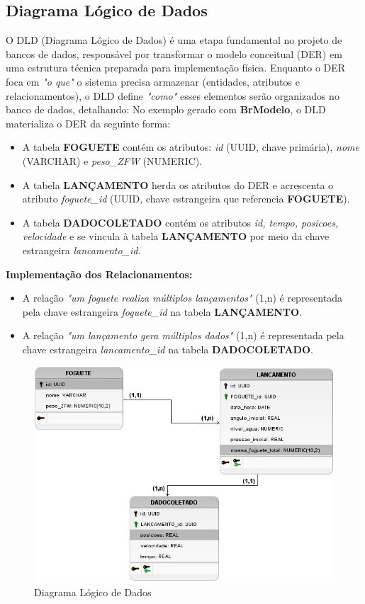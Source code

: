 \subsection{Diagrama Lógico de Dados}

O DLD (Diagrama Lógico de Dados) é uma etapa fundamental no projeto de bancos de dados, responsável por transformar o modelo conceitual (DER) em uma estrutura técnica preparada para implementação física. Enquanto o DER foca em \textit{"o que"} o sistema precisa armazenar (entidades, atributos e relacionamentos), o DLD define \textit{"como"} esses elementos serão organizados no banco de dados, detalhando: No exemplo gerado com \textbf{BrModelo}, o DLD materializa o DER da seguinte forma:

\begin{itemize}
  \item A tabela \textbf{FOGUETE} contém os atributos: \textit{id} (UUID, chave primária), \textit{nome} (VARCHAR) e \textit{peso\_ZFW} (NUMERIC).
  
  \item A tabela \textbf{LANÇAMENTO} herda os atributos do DER e acrescenta o atributo \textit{foguete\_id} (UUID, chave estrangeira que referencia \textbf{FOGUETE}).

  \item A tabela \textbf{DADOCOLETADO} contém os atributos \textit{id, tempo, posicoes, velocidade} e se vincula à tabela \textbf{LANÇAMENTO} por meio da chave estrangeira \textit{lancamento\_id}.
\end{itemize}

\textbf{Implementação dos Relacionamentos:}
\begin{itemize}
  \item A relação \textit{"um foguete realiza múltiplos lançamentos"} (1,n) é representada pela chave estrangeira \textit{foguete\_id} na tabela \textbf{LANÇAMENTO}.

  \item A relação \textit{"um lançamento gera múltiplos dados"} (1,n) é representada pela chave estrangeira \textit{lancamento\_id} na tabela \textbf{DADOCOLETADO}.
\end{itemize}

\begin{figure}[H]
\centering
\includegraphics[width=0.75\linewidth]{editaveis/figuras/diagrama_LogicoDados.png}
\caption{Diagrama Lógico de Dados}
\label{fig:dld}
\end{figure}



